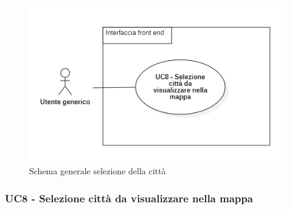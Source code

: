 \begin{center}
	\begin{figure}[H]
		\centering\includegraphics[scale=0.8]{../immagini/attori_casi/UC_8.png}
		\caption{Schema generale selezione della città}
	\end{figure}
\end{center}


\subsubsection{UC8 - Selezione città da visualizzare nella mappa}\label{CasiDUsoCasiDUsoTraUnUtenteEIlFrontEndElencoCasiDUsoUC4SelezioneCittaDaVisualizzareNellaMappa}

